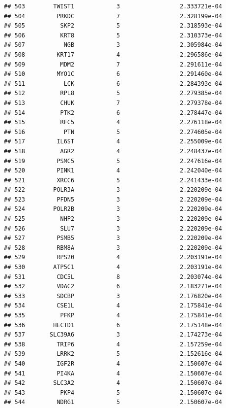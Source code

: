 \documentclass[
]{article}
\begin{document}
\begin{verbatim}
## 503        TWIST1            3                 2.333721e-04
## 504         PRKDC            7                 2.328199e-04
## 505          SKP2            5                 2.318593e-04
## 506          KRT8            5                 2.310373e-04
## 507           NGB            3                 2.305984e-04
## 508         KRT17            4                 2.296586e-04
## 509          MDM2            7                 2.291611e-04
## 510         MYO1C            6                 2.291460e-04
## 511           LCK            6                 2.284393e-04
## 512          RPL8            5                 2.279385e-04
## 513          CHUK            7                 2.279378e-04
## 514          PTK2            6                 2.278447e-04
## 515          RFC5            4                 2.276118e-04
## 516           PTN            5                 2.274605e-04
## 517         IL6ST            4                 2.255009e-04
## 518          AGR2            4                 2.248437e-04
## 519         PSMC5            5                 2.247616e-04
## 520         PINK1            4                 2.242040e-04
## 521         XRCC6            5                 2.241433e-04
## 522        POLR3A            3                 2.220209e-04
## 523         PFDN5            3                 2.220209e-04
## 524        POLR2B            3                 2.220209e-04
## 525          NHP2            3                 2.220209e-04
## 526          SLU7            3                 2.220209e-04
## 527         PSMB5            3                 2.220209e-04
## 528         RBM8A            3                 2.220209e-04
## 529         RPS20            4                 2.203191e-04
## 530        ATP5C1            4                 2.203191e-04
## 531         CDC5L            8                 2.203074e-04
## 532         VDAC2            6                 2.183271e-04
## 533         SDCBP            3                 2.176820e-04
## 534         CSE1L            4                 2.175841e-04
## 535          PFKP            4                 2.175841e-04
## 536        HECTD1            6                 2.175148e-04
## 537       SLC39A6            3                 2.174273e-04
## 538         TRIP6            4                 2.157259e-04
## 539         LRRK2            5                 2.152616e-04
## 540         IGF2R            4                 2.150607e-04
## 541         PI4KA            4                 2.150607e-04
## 542        SLC3A2            4                 2.150607e-04
## 543          PKP4            5                 2.150607e-04
## 544         NDRG1            5                 2.150607e-04

\end{verbatim}
\end{document}
